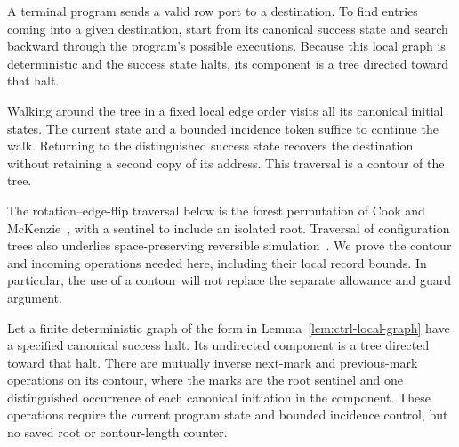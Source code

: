 A terminal program sends a valid row port to a destination. To find entries coming into a given destination, start from its canonical success state and search backward through the program's possible executions. Because this local graph is deterministic and the success state halts, its component is a tree directed toward that halt.

Walking around the tree in a fixed local edge order visits all its canonical initial states. The current state and a bounded incidence token suffice to continue the walk. Returning to the distinguished success state recovers the destination without retaining a second copy of its address. This traversal is a contour of the tree.

The rotation--edge-flip traversal below is the forest permutation
of Cook and McKenzie~\cite[Proposition~1, p.~387]{CookMcKenzie1987},
with a sentinel to include an isolated root. Traversal of configuration
trees also underlies space-preserving reversible simulation~\cite{LMT2000}.
We prove the contour and
incoming operations needed here, including their local record bounds.
In particular, the use of a contour will not replace the separate
allowance and guard argument.

\begin{lemma}\label{lem:ctrl-tour}
Let a finite deterministic graph of the form in
Lemma~\ref{lem:ctrl-local-graph} have a specified canonical success halt.
Its undirected component is a tree directed toward that halt.  There
are mutually inverse next-mark and previous-mark operations on its
contour, where the marks are the root sentinel and one distinguished
occurrence of each canonical initiation in the component.  These
operations require the current program state and bounded incidence
control, but no saved root or contour-length counter.
\end{lemma}

